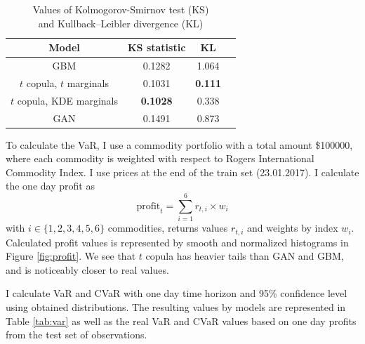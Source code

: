 \documentclass{article}
\begin{document}
\begin{table}[ht!]
    \begin{center}
    \begin{tabular}{ |c|c|c|c| } 
    \hline
    Model & KS statistic & KL \\ 
    \hline
    GBM & 0.1282 & 1.064 \\ 
    $t$ copula, $t$ marginals & 0.1031 & \textbf{0.111} \\ 
    $t$ copula, KDE marginals & \textbf{0.1028} & 0.338 \\ 
    GAN & 0.1491 & 0.873 \\ 
    \hline
    \end{tabular}
    \end{center}
    \caption{Values of Kolmogorov-Smirnov test (KS) \\and Kullback–Leibler divergence (KL)}
    \label{tab:quality}
\end{table}

To calculate the VaR, I use a commodity portfolio with a total amount \$100000, where each commodity is weighted with respect to Rogers International Commodity Index. I use prices at the end of the train set (23.01.2017). I calculate the one day profit as
$$\text{profit}_t = \sum_{i=1}^6 r_{t,i} \times w_i$$
with $i \in \{1, 2, 3, 4, 5 , 6\}$ commodities, returns values $r_{t, i}$ and weights by index $w_i$. Calculated profit values is represented by smooth and normalized histograms in Figure \ref{fig:profit}. We see that $t$ copula has heavier tails than GAN and GBM, and is noticeably closer to real values.

I calculate VaR and CVaR with one day time horizon and 95\% confidence level using obtained distributions. The resulting values by models are represented in Table \ref{tab:var} as well as the real VaR and CVaR values based on one day profits from the test set of observations.
\end{document}
